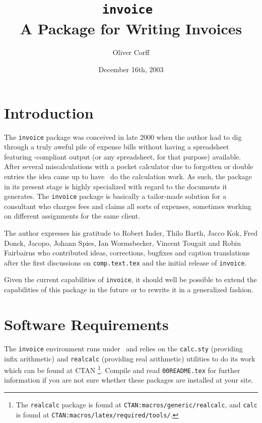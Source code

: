 \documentclass[11pt]{ltxdoc}
\title{\texttt{invoice \InvoiceVersion}\\
	A Package for Writing Invoices}
\author{Oliver Corff}
\date{December 16th, 2003}
\begin{document}
\maketitle

\tableofcontents

\section{Introduction}

The \texttt{invoice} package was conceived in late 2000 when the
author had to dig through a truly aweful pile of expense bills
without having a spreadsheet featuring \LaTeXe-compliant output (or
any spreadsheet, for that purpose) available. After several
miscalculations with a pocket calculator due to forgotten or
double entries the idea came up to have \LaTeXe\ do the calculation
work. As such, the package in its present stage is highly
specialized with regard to the documents it generates. The
\texttt{invoice} package is basically a tailor-made solution for a
consultant who charges fees and claims all sorts of expenses,
sometimes working on different assignments for the same client.

The author expresses his gratitude to
Robert Inder,
Thilo Barth,
Jacco Kok,
Fred Donck,
Jacopo,
Johann Spies,
Ian Wormsbecker,
Vincent Tougait
and
Robin Fairbairns
who contributed ideas, corrections,
bugfixes and caption translations after the first discussions on
\texttt{comp.text.tex} and the initial release of \texttt{invoice}.

Given the current capabilities of \texttt{invoice}, it should well
be possible to extend the capabilities of this package in the future
or to rewrite it in a generalized fashion.

\section{Software Requirements}

The \texttt{invoice} environment runs under \LaTeXe\ and relies on the
\texttt{calc.sty} (providing infix arithmetic) and \texttt{realcalc}
(providing real arithmetic) utilities to do its work which can be found
at CTAN%
	\footnote{The \texttt{realcalc} package is found at
	\texttt{CTAN:macros/generic/realcalc},
	and \texttt{calc} is found at
	\texttt{CTAN:macros/latex/required/tools/}.}.
Compile and read \texttt{00README.tex} for further information if
you are not sure whether these packages are installed at your site.
\end{document}
